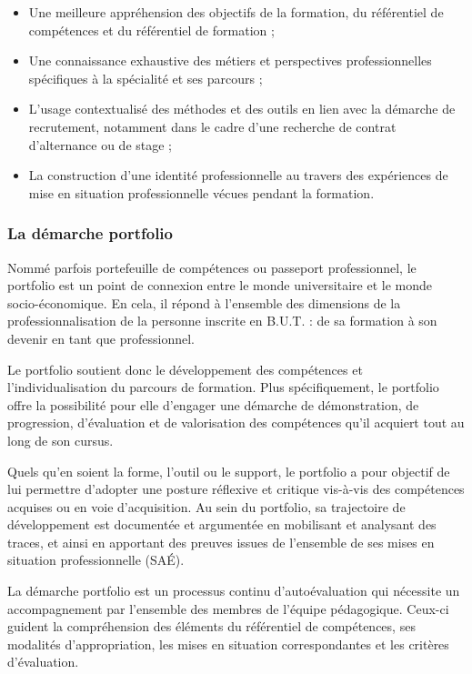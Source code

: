 \documentclass[10pt]{article}
\begin{document}
\begin{itemize}
\item Une meilleure appréhension des objectifs de la formation, du
  référentiel de compétences et du référentiel de formation ;
\item Une connaissance exhaustive des métiers et perspectives
  professionnelles spécifiques à la spécialité et ses parcours ;
\item L'usage contextualisé des méthodes et des outils en lien avec la
  démarche de recrutement, notamment dans le cadre d'une recherche de
  contrat d'alternance ou de stage ;
\item La construction d'une identité professionnelle au travers des
  expériences de mise en situation professionnelle vécues pendant la
  formation.
\end{itemize}

\subsubsection{La démarche portfolio}%
Nommé parfois portefeuille de compétences ou passeport professionnel, le
portfolio est un point de connexion entre le monde universitaire et le
monde socio-économique. En cela, il répond à l'ensemble des dimensions
de la professionnalisation de la personne inscrite en B.U.T. : de sa
formation à son devenir en tant que professionnel.

Le portfolio soutient donc le développement des compétences et
l'individualisation du parcours de formation.  Plus spécifiquement, le
portfolio offre la possibilité pour elle d'engager une démarche de
démonstration, de progression, d'évaluation et de valorisation des
compétences qu'il acquiert tout au long de son cursus.

Quels qu'en soient la forme, l'outil ou le support, le portfolio a pour
objectif de lui permettre d'adopter une posture réflexive et critique
vis-à-vis des compétences acquises ou en voie d'acquisition. Au sein du
portfolio, sa trajectoire de développement est documentée et argumentée
en mobilisant et analysant des traces, et ainsi en apportant des preuves
issues de l'ensemble de ses mises en situation professionnelle (SAÉ).

La démarche portfolio est un processus continu d'autoévaluation qui
nécessite un accompagnement par l'ensemble des membres de l'équipe
pédagogique. Ceux-ci guident la compréhension des éléments du
référentiel de compétences, ses modalités d'appropriation, les mises en
situation correspondantes et les critères d'évaluation.
\end{document}
